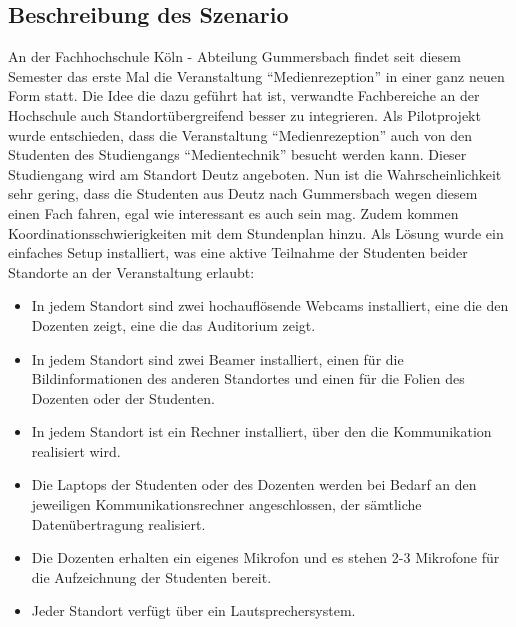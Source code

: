 
\subsection{Beschreibung des Szenario} %
\label{sub:beschreibung_des_szenario}

  An der Fachhochschule Köln - Abteilung Gummersbach findet seit diesem Semester das erste Mal die Veranstaltung "`Medienrezeption"' in einer ganz neuen Form statt. Die Idee die dazu geführt hat ist, verwandte Fachbereiche an der Hochschule auch Standortübergreifend besser zu integrieren. Als Pilotprojekt wurde entschieden, dass die Veranstaltung "`Medienrezeption"' auch von den Studenten des Studiengangs "`Medientechnik"' besucht werden kann. Dieser Studiengang wird am Standort Deutz angeboten. Nun ist die Wahrscheinlichkeit sehr gering, dass die Studenten aus Deutz nach Gummersbach wegen diesem einen Fach fahren, egal wie interessant es auch sein mag. Zudem kommen Koordinationsschwierigkeiten mit dem Stundenplan hinzu. Als Lösung wurde ein einfaches Setup installiert, was eine aktive Teilnahme der Studenten beider Standorte an der Veranstaltung erlaubt:

\begin{itemize}

	\item In jedem Standort sind zwei hochauflösende Webcams installiert, eine die den Dozenten zeigt, eine die das Auditorium zeigt.
	\item In jedem Standort sind zwei Beamer installiert, einen für die Bildinformationen des anderen Standortes und einen für die Folien des Dozenten oder der Studenten.
	\item In jedem Standort ist ein Rechner installiert, über den die Kommunikation realisiert wird.
	\item Die Laptops der Studenten oder des Dozenten werden bei Bedarf an den jeweiligen Kommunikationsrechner angeschlossen, der sämtliche Datenübertragung realisiert.
	\item Die Dozenten erhalten ein eigenes Mikrofon und es stehen 2-3 Mikrofone für die Aufzeichnung der Studenten bereit.
	\item Jeder Standort verfügt über ein Lautsprechersystem.

\end{itemize}


